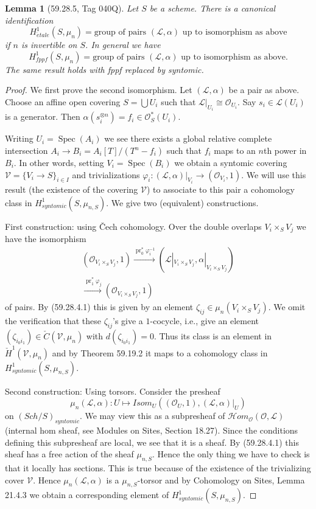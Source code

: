\documentclass[UTF8,11pt]{ctexart}
\newtheorem*{lemma}{Lemma}
\theoremstyle{definition}
\begin{document}
\begin{lemma}[59.28.5, Tag 040Q]
Let $S$ be a scheme. There is a canonical identification
\[H^1_{\acute etale}(S,\mu_n)=\text{group of pairs $(\mathcal L,\alpha)$ up to isomorphism as above}\]
if $n$ is invertible on $S$. In general we have
\[H^1_{fppf}(S,\mu_n)=\text{group of pairs $(\mathcal L,\alpha)$ up to isomorphism as above}.\]
The same result holds with fppf replaced by syntomic.
\end{lemma}
\begin{proof}
We first prove the second isomorphism. Let $(\mathcal L,\alpha)$ be a pair as above. Choose an affine open covering $S=\bigcup U_i$ such that $\mathcal L|_{U_i}\cong\mathcal O_{U_i}$. Say $s_i\in\mathcal L(U_i)$ is a generator. Then $\alpha(s_i^{\otimes n})=f_i\in\mathcal O_S^*(U_i)$.

Writing $U_i=\operatorname{Spec}(A_i)$ we see there exists a global relative complete intersection $A_i\to B_i=A_i[T]/(T^n-f_i)$ such that $f_i$ maps to an $n$th power in $B_i$. In other words, setting $V_i=\operatorname{Spec}(B_i)$ we obtain a syntomic covering $\mathcal V=\{V_i\to S\}_{i\in I}$ and trivializations $\varphi_i:(\mathcal L,\alpha)|_{V_i}\to(\mathcal O_{V_i},1)$.
We will use this result (the existence of the covering $\mathcal V$) to associate to this pair a cohomology class in $H^1_{syntomic}(S,\mu_{n,S})$. We give two (equivalent) constructions.

First construction: using \v Cech cohomology. Over the double overlaps $V_i\times_S V_j$ we have the isomorphism
\begin{gather*}
(\mathcal O_{V_i\times_S V_j},1)
\xrightarrow{\operatorname{pr}_0^*\varphi_i^{-1}}
(\mathcal L|_{V_i\times_S V_j},\alpha|_{V_i\times_S V_j})\\
\xrightarrow{\operatorname{pr}_1^*\varphi_j}(\mathcal O_{V_i\times_S V_j},1)
\end{gather*}
of pairs. By (59.28.4.1) this is given by an element $\zeta_{ij}\in\mu_n(V_i\times_S V_j)$. We omit the verification that these $\zeta_{ij}$'s give a $1$-cocycle, i.e., give an element $(\zeta_{i_0i_1})\in\check C(\mathcal V,\mu_n)$ with $d(\zeta_{i_0i_1})=0$. Thus its class is an element in $\check H^1(\mathcal V,\mu_n)$ and by Theorem 59.19.2 it maps to a cohomology class in $H^1_{syntomic}(S,\mu_{n,S})$.

Second construction: Using torsors. Consider the presheaf
\[\mu_n(\mathcal L,\alpha):U\longmapsto\mathit{Isom}_U((\mathcal O_U,1),(\mathcal L,\alpha)|_U)\]
on $(\mathit{Sch}/S)_{syntomic}$. We may view this as a subpresheaf of $\mathcal Hom_{\mathcal O}(\mathcal O,\mathcal L)$ (internal hom sheaf, see Modules on Sites, Section 18.27). Since the conditions defining this subpresheaf are local, we see that it is a sheaf. By (59.28.4.1) this sheaf has a free action of the sheaf $\mu_{n,S}$. Hence the only thing we have to check is that it locally has sections. This is true because of the existence of the trivializing cover $\mathcal V$. Hence $\mu_n(\mathcal L,\alpha)$ is a $\mu_{n,S}$-torsor and by Cohomology on Sites, Lemma 21.4.3 we obtain a corresponding element of $H^1_{syntomic}(S,\mu_{n,S})$.


\end{proof}
\end{document}
